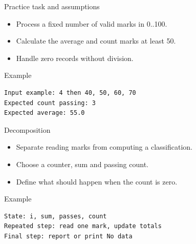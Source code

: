 \documentclass[10pt,aspectratio=169]{beamer}
\begin{document}
\begin{frame}[fragile,t]{Practice task and assumptions}
\begin{itemize}
\item Process a fixed number of valid marks in 0..100.
\item Calculate the average and count marks at least 50.
\item Handle zero records without division.
\end{itemize}
\vspace{1mm}\begin{block}{Example}
\begin{lstlisting}
Input example: 4 then 40, 50, 60, 70
Expected count passing: 3
Expected average: 55.0
\end{lstlisting}
\end{block}
\end{frame}

\begin{frame}[fragile,t]{Decomposition}
\begin{itemize}
\item Separate reading marks from computing a classification.
\item Choose a counter, sum and passing count.
\item Define what should happen when the count is zero.
\end{itemize}
\vspace{1mm}\begin{block}{Example}
\begin{lstlisting}
State: i, sum, passes, count
Repeated step: read one mark, update totals
Final step: report or print No data
\end{lstlisting}
\end{block}
\end{frame}
\end{document}
